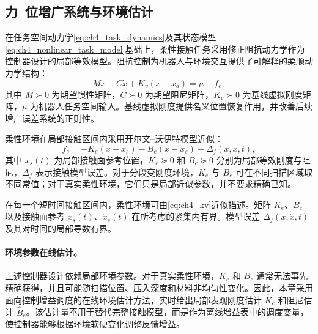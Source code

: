 \subsection{力--位增广系统与环境估计}
\label{subsec:ch4_augmented_system}

在任务空间动力学\eqref{eq:ch4_task_dynamics}及其状态模型\eqref{eq:ch4_nonlinear_task_model}基础上，柔性接触任务采用修正阻抗动力学作为控制器设计的局部等效模型。阻抗控制为机器人与环境交互提供了可解释的柔顺动力学结构\cite{hogan1985impedance}：
\begin{equation}
  M\ddot x+C\dot x+K_v(x-x_d)=\mu+f_e,
  \label{eq:ch4_impedance}
\end{equation}
其中 $M\succ0$ 为期望惯性矩阵，$C\succ0$ 为期望阻尼矩阵，$K_v\succ0$ 为基线虚拟刚度矩阵，$\mu$ 为机器人任务空间输入。基线虚拟刚度提供名义位置恢复作用，并改善后续增广误差系统的正则性。

柔性环境在局部接触区间内采用开尔文--沃伊特模型近似：
\begin{equation}
  f_e=-K_e(x-x_s)-B_e(\dot x-\dot x_s)+\Delta_f(x,\dot x,t),
  \label{eq:ch4_kv}
\end{equation}
其中 $x_s(t)$ 为局部接触面参考位置，$K_e\succeq0$ 和 $B_e\succeq0$ 分别为局部等效刚度与阻尼，$\Delta_f$ 表示接触模型误差。对于分段变刚度环境，$K_e$ 与 $B_e$ 可在不同扫描区域取不同常值；对于真实柔性环境，它们只是局部近似参数，并不要求精确已知。

\begin{assumption}[柔性接触模型局部有效性]
\label{ass:ch4_contact_model}
在每一个短时间接触区间内，柔性环境可由\eqref{eq:ch4_kv}近似描述。矩阵 $K_e$、$B_e$ 以及接触面参考 $x_s(t)$、$\dot x_s(t)$ 在所考虑的紧集内有界。模型误差 $\Delta_f(x,\dot x,t)$ 及其对时间的局部导数有界。
\end{assumption}

\paragraph{环境参数在线估计。}
\label{subsec:ch4_env_estimator}

上述控制器设计依赖局部环境参数。对于真实柔性环境，$K_e$ 和 $B_e$ 通常无法事先精确获得，并且可能随扫描位置、压入深度和材料非均匀性变化。因此，本章采用面向控制增益调度的在线环境估计方法，实时给出局部表观刚度估计 $\hat K_e$ 和阻尼估计 $\hat B_e$。该估计量不用于替代完整接触模型，而是作为离线增益表中的调度变量，使控制器能够根据环境软硬变化调整反馈增益。

